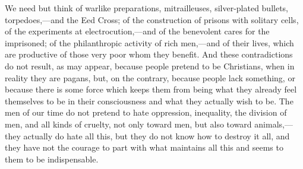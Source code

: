 \documentclass{book}
\begin{document}
We need but think of warlike preparations, mitrailleuses, silver-plated bullets, torpedoes,—and the Eed Cross; of the construction of prisons with solitary cells, of the experiments at electrocution,—and of the benevolent cares for the imprisoned; of the philanthropic activity of rich men,—and of their lives, which are productive of those very poor whom they benefit. And these contradictions do not result, as may appear, because people pretend to be Christians, when in reality they are pagans, but, on the contrary, because people lack something, or because there is some force which keeps them from being what they already feel themselves to be in their consciousness and what they actually wish to be. The men of our time do not pretend to hate oppression, inequality, the division of men, and all kinds of cruelty, not only toward men, but also toward animals,—they actually do hate all this, but they do not know how to destroy it all, and they have not the courage to part with what maintains all this and seems to them to be indispensable.
\end{document}
